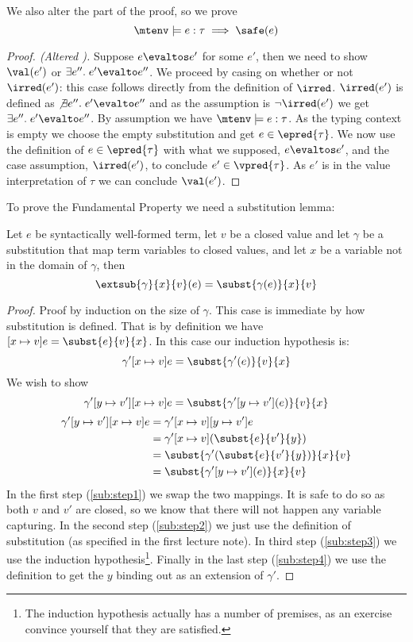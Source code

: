 We also alter the  part of the proof, so we prove
\[
  \mtenv \models e : \tau \implies \safe(e)
\]
\begin{proof}[Proof. (Altered )]
Suppose $e \evaltos e'$ for some $e'$, then we need to show $\val(e')$ or $\exists e''. \; e' \evalto e''$. We proceed by casing on whether or not $\irred(e')$:
 this case follows directly from the definition of $\irred$. $\irred(e')$ is defined as $\not \exists e''. \; e' \evalto e''$ and as the assumption is $\neg \irred(e')$ we get $\exists e''. \; e' \evalto e''$.
 By assumption we have $\mtenv \models e : \tau$. As the typing context is empty we choose the empty substitution and get $e \in \epred{\tau}$. We now use the definition of $e \in \epred{\tau}$ with what we supposed, $e \evaltos e'$, and the case assumption, $\irred(e')$, to conclude $e' \in \vpred{\tau}$. As $e'$ is in the value interpretation of $\tau$ we can conclude $\val(e')$. 
\end{proof}
To prove the Fundamental Property we need a substitution lemma:
\begin{lemma}[Substitution]
Let $e$ be syntactically well-formed term, let $v$ be a closed value and let $\gamma$ be a substitution that map term variables to closed values, and let $x$ be a variable not in the domain of $\gamma$, then
\[
\extsub{\gamma}{x}{v}(e) = \subst{\gamma(e)}{x}{v}
\]
\end{lemma}
\begin{proof}
  Proof by induction on the size of $\gamma$.
  \case{$\gamma = \emptyset$} This case is immediate by how substitution is defined. That is by definition we have $[x \mapsto v] e = \subst{e}{v}{x}$.
   In this case our induction hypothesis is:
\[
  \gamma'[x \mapsto v] e = \subst{\gamma'(e)}{v}{x}
\]
We wish to show 
\[
  \gamma'[y \mapsto v'][x \mapsto v] e = \subst{\gamma'[y \mapsto v'](e)}{v}{x}
\]
\begin{align}
    \gamma'[y \mapsto v'][x \mapsto v] e & = \gamma'[x \mapsto v][y \mapsto v'] e \label{sub:step1}\\
                                         & = \gamma'[x \mapsto v] (\subst{e}{v'}{y}) \label{sub:step2}\\
                                         & = \subst{\gamma'(\subst{e}{v'}{y})}{x}{v}\label{sub:step3}\\
                                         & = \subst{\gamma'[y \mapsto v'](e)}{x}{v}\label{sub:step4}
\end{align}
In the first step (\ref{sub:step1}) we swap the two mappings. It is safe to do so as both $v$ and $v'$ are closed, so we know that there will not happen any variable capturing. In the second step (\ref{sub:step2}) we just use the definition of substitution (as specified in the first lecture note). In third step (\ref{sub:step3}) we use the induction hypothesis\footnote{The induction hypothesis actually has a number of premises, as an exercise convince yourself that they are satisfied.}. Finally in the last step (\ref{sub:step4}) we use the definition to get the $y$ binding out as an extension of $\gamma'$.
\end{proof}

